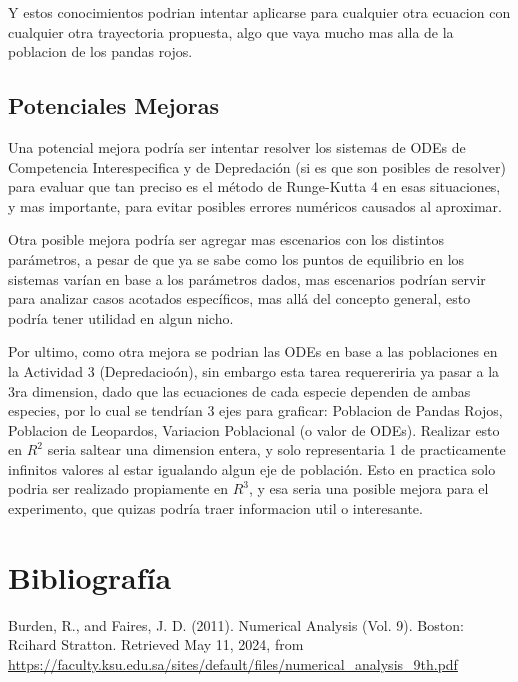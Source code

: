 \documentclass{article}
\begin{document}
\noindent Y estos conocimientos podrian intentar aplicarse para cualquier otra ecuacion con cualquier otra trayectoria propuesta, algo que vaya mucho mas alla de la poblacion de los pandas rojos.



\subsection*{Potenciales Mejoras}

\noindent Una potencial mejora podría ser intentar resolver los sistemas de ODEs de Competencia Interespecifica y de Depredación (si es que son posibles de resolver) para evaluar que tan preciso es el método de Runge-Kutta 4 en esas situaciones, y mas importante, para evitar posibles errores numéricos causados al aproximar. \vspace{1\baselineskip}

\noindent Otra posible mejora podría ser agregar mas escenarios con los distintos parámetros, a pesar de que ya se sabe como los puntos de equilibrio en los sistemas varían en base a los parámetros dados, mas escenarios podrían servir para analizar casos acotados específicos, mas allá del concepto general, esto podría tener utilidad en algun nicho.
\vspace{1\baselineskip}

\noindent Por ultimo, como otra mejora se podrian las ODEs en base a las poblaciones en la Actividad 3 (Depredacioón), sin embargo esta tarea requereriria ya pasar a la 3ra dimension, dado que las ecuaciones de cada especie dependen de ambas especies, por lo cual se tendrían 3 ejes para graficar: Poblacion de Pandas Rojos, Poblacion de Leopardos, Variacion Poblacional (o valor de ODEs). Realizar esto en $R^2$ seria saltear una dimension entera, y solo representaria 1 de practicamente infinitos valores al estar igualando algun eje de población. Esto en practica solo podria ser realizado propiamente en $R^3$, y esa seria una posible mejora para el experimento, que quizas podría traer informacion util o interesante.

\label{LastPage}



\section*{Bibliografía}

\noindent Burden, R., and Faires, J. D. (2011). Numerical Analysis (Vol. 9). Boston: Rcihard Stratton. Retrieved May 11, 2024, from \url{https://faculty.ksu.edu.sa/sites/default/files/numerical_analysis_9th.pdf} 
\vspace{1\baselineskip}
\end{document}
